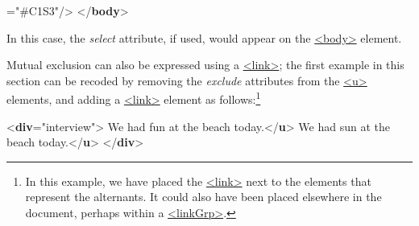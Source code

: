 \begin{shaded}
{\hspace*{1em}\hspace*{1em}\hspace*{1em}{exclude}="{\#C1S3}"/>}\mbox{}\newline 
{}\mbox{}\newline 
{</\textbf{body}>}\end{shaded}\egroup\par \noindent  In this case, the {\itshape select} attribute, if used, would appear on the \hyperref[TEI.body]{<body>} element.\par
Mutual exclusion can also be expressed using a \hyperref[TEI.link]{<link>}; the first example in this section can be recoded by removing the {\itshape exclude} attributes from the \hyperref[TEI.u]{<u>} elements, and adding a \hyperref[TEI.link]{<link>} element as follows:\footnote{In this example, we have placed the \hyperref[TEI.link]{<link>} next to the elements that represent the alternants. It could also have been placed elsewhere in the document, perhaps within a \hyperref[TEI.linkGrp]{<linkGrp>}.} \par\bgroup{}\exampleFont \begin{shaded}\noindent\mbox{}{<\textbf{div}\hspace*{1em}{type}="{interview}">}\mbox{}\newline 
{}We had fun at the beach today.{</\textbf{u}>}\mbox{}\newline 
{}We had sun at the beach today.{</\textbf{u}>}\mbox{}\newline 
{}\mbox{}\newline 
{</\textbf{div}>}\end{shaded}\egroup\par \par
